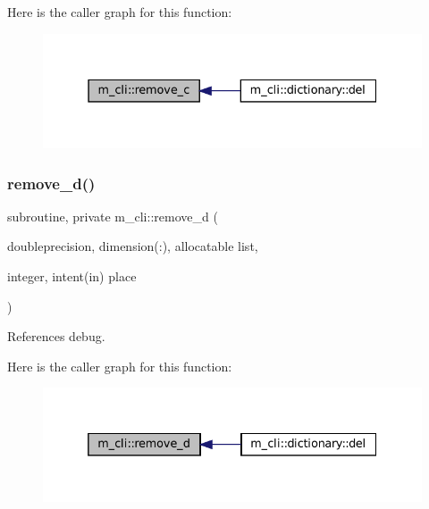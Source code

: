 Here is the caller graph for this function\+:\nopagebreak
\begin{figure}[H]
\begin{center}
\leavevmode
\includegraphics[width=331pt]{namespacem__cli_a05f549b10f50798d68003b8fd2a2d86a_icgraph}
\end{center}
\end{figure}
\mbox{\label{namespacem__cli_abf22cbc2af66482f33b7bb1a210d9d99}} 
\subsubsection{\texorpdfstring{remove\+\_\+d()}{remove\_d()}}
{\footnotesize\ttfamily subroutine, private m\+\_\+cli\+::remove\+\_\+d (\begin{DoxyParamCaption}\item[{doubleprecision, dimension(\+:), allocatable}]{list,  }\item[{integer, intent(in)}]{place }\end{DoxyParamCaption})\hspace{0.3cm}{\ttfamily [private]}}



References debug.

Here is the caller graph for this function\+:\nopagebreak
\begin{figure}[H]
\begin{center}
\leavevmode
\includegraphics[width=332pt]{namespacem__cli_abf22cbc2af66482f33b7bb1a210d9d99_icgraph}
\end{center}
\end{figure}
\mbox{\label{namespacem__cli_afa08d3d87184a6dd68a124231e536c93}} 

